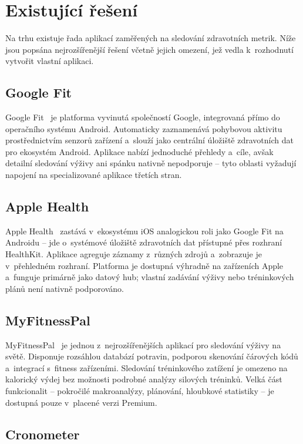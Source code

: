 \section{Existující řešení}

Na trhu existuje řada aplikací zaměřených na sledování zdravotních metrik.
Níže jsou popsána nejrozšířenější řešení včetně jejich omezení, jež vedla
k~rozhodnutí vytvořit vlastní aplikaci.

\subsection{Google Fit}

Google Fit~\cite{googlefit2024} je platforma vyvinutá společností Google,
integrovaná přímo do operačního systému Android. Automaticky zaznamenává pohybovou
aktivitu prostřednictvím senzorů zařízení a~slouží jako centrální úložiště
zdravotních dat pro ekosystém Android. Aplikace nabízí jednoduché přehledy
a~cíle, avšak detailní sledování výživy ani spánku nativně nepodporuje --
tyto oblasti vyžadují napojení na specializované aplikace třetích stran.

\subsection{Apple Health}

Apple Health~\cite{applehealth2024} zastává v~ekosystému iOS analogickou roli
jako Google Fit na Androidu -- jde o~systémové úložiště zdravotních dat přístupné
přes rozhraní HealthKit. Aplikace agreguje záznamy z~různých zdrojů a~zobrazuje
je v~přehledném rozhraní. Platforma je dostupná výhradně na zařízeních Apple
a~funguje primárně jako datový hub; vlastní zadávání výživy nebo tréninkových
plánů není nativně podporováno.

\subsection{MyFitnessPal}

MyFitnessPal~\cite{myfitnesspal2024} je jednou z~nejrozšířenějších aplikací pro
sledování výživy na světě. Disponuje rozsáhlou databází potravin, podporou
skenování čárových kódů a~integrací s~fitness zařízeními. Sledování tréninkového
zatížení je omezeno na kalorický výdej bez možnosti podrobné analýzy silových
tréninků. Velká část funkcionalit -- pokročilé makroanalýzy, plánování, hloubkové
statistiky -- je dostupná pouze v~placené verzi Premium.

\subsection{Cronometer}

